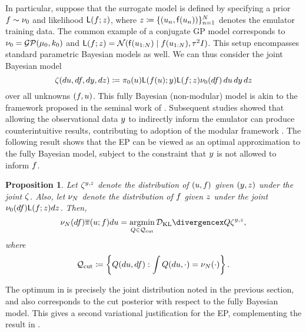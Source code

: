 \documentclass[12pt]{article}
\newtheorem{prop}{Proposition}
\begin{document}
In particular, suppose that the surrogate model is defined by specifying 
a prior $\targetTraj \sim \emDist[0]$ and likelihood $\lik(\targetTraj; \emObs)$,
where $\emObs \Def \{(\Par_n, \target(\Par_n))\}_{n=1}^{\Ndesign}$ denotes
the emulator training data. The common example of a conjugate GP model 
corresponds to $\emDist[0] = \GP(\gpMean[0], \gpKer[0])$ and 
$\lik(\targetTraj; \emObs) = \Gaussian(\target(\Par_{1:\Ndesign}) \given \targetTraj(\Par_{1:\Ndesign}), \tau^2 I)$.
This setup encompasses standard parametric Bayesian models as well.
We can thus consider the joint Bayesian model 
\begin{equation}
\jointKOH(d\Par, d\targetTraj, d\obs, d\emObs) \Def
\priorDens(\Par) \lik(\targetTraj(\Par); \obs) \lik(\targetTraj; \emObs) 
\emDist[0](d\targetTraj) \, d\Par \, d\obs \, d\emObs
\label{eq:koh-joint}
\end{equation}
over all unknowns $(\targetTraj, \Par)$. This fully Bayesian (non-modular) model 
is akin to the framework proposed in the seminal work of \citet{KOH}. Subsequent 
studies showed that allowing the observational data $\obs$ to indirectly inform 
the emulator can produce counterintuitive results, contributing to adoption of 
the modular framework \citep{modularization}. The following result shows that 
the EP can be viewed as an optimal approximation to the fully Bayesian model, 
subject to the constraint that $\obs$ is not allowed to inform $\targetTraj$.

\begin{prop} \label{prop:kl-cut-op}
Let $\jointKOH^{\obs, \emObs}$ denote the distribution of $(\Par, \targetTraj)$
given $(\obs, \emObs)$ under the joint $\jointKOH$. Also, let $\emDist$ denote 
the distribution of $\targetTraj$ given $\emObs$ under the joint 
$\emDist[0](d\targetTraj) \lik(\targetTraj; \emObs) d\emObs$. Then, 
\begin{equation}
\emDist(d\targetTraj) \postDensNorm(\Par; \targetTraj)d\Par
= \argmin_{\qMeas \in \qSpace_{\mathrm{cut}}} \KL{\qMeas}{\jointKOH^{\obs, \emObs}},
\label{eq:kl-cut-opt}
\end{equation}
where 
\begin{equation}
\qSpace_{\mathrm{cut}} \Def 
\left\{\qMeas(d\Par, d\targetTraj) : \int \qMeas(d\Par, \cdot) = \emDist(\cdot) \right\}.
\end{equation}
\end{prop} 
The optimum in  is precisely the joint distribution noted in the previous 
section, and also corresponds to the cut posterior with respect to the fully Bayesian model.
This gives a second variational justification for the EP, complementing the result in 
.
\end{document}
